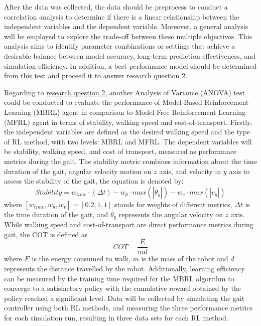 After the data was collected, the data should be preprocess to conduct a correlation analysis to determine if there is a linear relationship between the independent variables and the dependent variable. Moreover, a general analysis will be employed to explore the trade-off between these multiple objectives. This analysis aims to identify parameter combinations or settings that achieve a desirable balance between model accuracy, long-term prediction effectiveness, and simulation efficiency. In addition, a best performance model should be determined from this test and proceed it to answer research question 2. 

Regarding to \hyperref[rq2]{research question 2}, another Analysis of Variance (ANOVA) test could be conducted to evaluate the performance of Model-Based Reinforcement Learning (MBRL) agent in comparison to Model-Free Reinforcement Learning (MFRL) agent in terms of stability, walking speed and cost-of-transport. Firstly, the independent variables are defined as the desired walking speed and the type of RL method, with two levels: MBRL and MFRL. The dependent variables will be stability, walking speed, and cost of transport, measured as performance metrics during the gait. The stability metric combines information about the time duration of the gait, angular velocity motion on $z$ axis, and velocity in $y$ axis to assess the stability of the gait, the equation is denoted by:
\begin{equation}
Stability = w_{time} \cdot (\Delta t) - w_{\Dot{\theta}} \cdot max(|\Dot{\theta_y}|) - w_{v} \cdot max(|v_y|)
\label{eq:stability}
\end{equation}
where $[w_{time},w_{\Dot{\theta}},w_{v}] = [0.2,1,1]$ stands for weights of different metrics, $\Delta t$ is the time duration of the gait, and $\Dot{\theta_y}$ represents the angular velocity on $z$ axis. While walking speed and cost-of-transport are direct performance metrics during gait, the COT is defined as 
\begin{equation}
    COT = \frac{E}{md}
    \label{eq:COT}
\end{equation}
where $E$ is the energy consumed to walk, $m$ is the mass of the robot and $d$ represents the distance travelled by the robot. Additionally, learning efficiency can be measured by the training time required for the MBRL algorithm to converge to a satisfactory policy with the cumulative reward obtained by the policy reached a significant level. Data will be collected by simulating the gait controller using both RL methods, and measuring the three performance metrics for each simulation run, resulting in three data sets for each RL method. 
